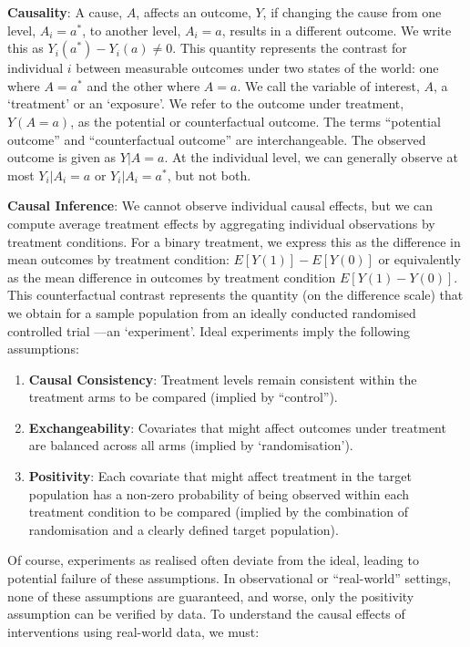 \documentclass[
  single column]{article}
\providecommand{\tightlist}{%
  \setlength{\itemsep}{0pt}\setlength{\parskip}{0pt}}\usepackage{longtable,booktabs,array}
\begin{document}
\textbf{Causality}: A cause, \(A\), affects an outcome, \(Y\), if
changing the cause from one level, \(A_i = a^*\), to another level,
\(A_i = a\), results in a different outcome. We write this as
\(Y_i(a^*) - Y_i(a) \neq 0\). This quantity represents the contrast for
individual \(i\) between measurable outcomes under two states of the
world: one where \(A = a^*\) and the other where \(A = a\). We call the
variable of interest, \(A\), a `treatment' or an `exposure'. We refer to
the outcome under treatment, \(Y(A = a)\), as the potential or
counterfactual outcome. The terms ``potential outcome'' and
``counterfactual outcome'' are interchangeable. The observed outcome is
given as \(Y|A=a\). At the individual level, we can generally observe at
most \(Y_i|A_i =a\) or \(Y_i|A_i =a^*\), but not both.

\textbf{Causal Inference}: We cannot observe individual causal effects,
but we can compute average treatment effects by aggregating individual
observations by treatment conditions. For a binary treatment, we express
this as the difference in mean outcomes by treatment condition:
\(E[Y(1)] - E[Y(0)]\) or equivalently as the mean difference in outcomes
by treatment condition \(E[Y(1) - Y(0)]\). This counterfactual contrast
represents the quantity (on the difference scale) that we obtain for a
sample population from an ideally conducted randomised controlled trial
---an `experiment'. Ideal experiments imply the following assumptions:

\begin{enumerate}
\def\labelenumi{\arabic{enumi}.}
\tightlist
\item
  \textbf{Causal Consistency}: Treatment levels remain consistent within
  the treatment arms to be compared (implied by ``control'').
\item
  \textbf{Exchangeability}: Covariates that might affect outcomes under
  treatment are balanced across all arms (implied by `randomisation').
\item
  \textbf{Positivity}: Each covariate that might affect treatment in the
  target population has a non-zero probability of being observed within
  each treatment condition to be compared (implied by the combination of
  randomisation and a clearly defined target population).
\end{enumerate}

Of course, experiments as realised often deviate from the ideal, leading
to potential failure of these assumptions. In observational or
``real-world'' settings, none of these assumptions are guaranteed, and
worse, only the positivity assumption can be verified by data. To
understand the causal effects of interventions using real-world data, we
must:
\end{document}
